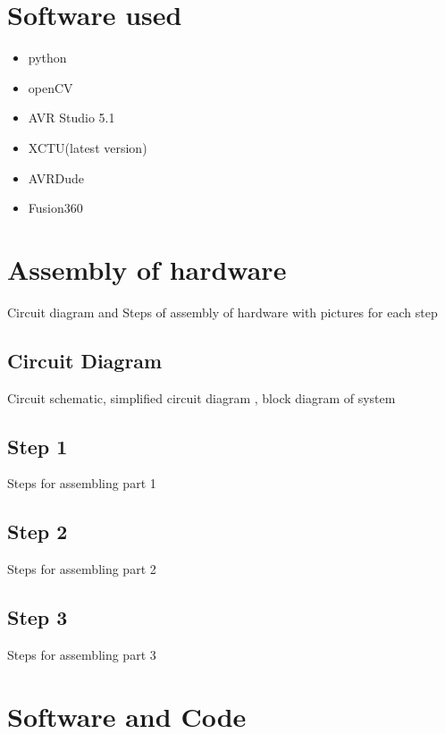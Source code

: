 \documentclass[a4paper,12pt,oneside]{book}
\begin{document}
\section{Software used}
\begin{itemize}
  \item python
  \item openCV
  \item AVR Studio 5.1
  \item XCTU(latest version)
  \item AVRDude
  \item Fusion360
\end{itemize}

\section{Assembly of hardware}
Circuit diagram and Steps of assembly of hardware with pictures for each step
\subsection*{Circuit Diagram}
Circuit schematic, simplified circuit diagram , block diagram of system
\subsection*{Step 1}
Steps for assembling part 1
\subsection*{Step 2}
Steps for assembling part 2
\subsection*{Step 3}
Steps for assembling part 3



\section{Software and Code}
\end{document}
